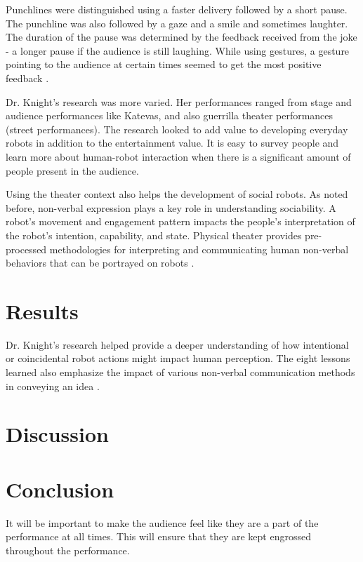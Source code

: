 \documentclass[onecolumn, draftclsnofoot,10pt, compsoc]{IEEEtran}
\begin{document}
Punchlines were distinguished using a faster delivery followed by a short pause. The punchline was also followed by a gaze and a smile and sometimes laughter. The duration of the pause was determined by the feedback received from the joke - a longer pause if the audience is still laughing. While using gestures, a gesture pointing to the audience at certain times seemed to get the most positive feedback \cite{RobotComedyLab:2015}.

Dr. Knight's research was more varied. Her performances ranged from stage and audience performances like Katevas, and also guerrilla theater performances (street performances). The research looked to add value to developing everyday robots in addition to the entertainment value. It is easy to survey people and learn more about human-robot interaction when there is a significant amount of people present in the audience. 

Using the theater context also helps the development of social robots. As noted before, non-verbal expression plays a key role in understanding sociability. A robot's movement and engagement pattern impacts the people's interpretation of the robot's intention, capability, and state. Physical theater provides pre-processed methodologies for interpreting and communicating human non-verbal behaviors that can be portrayed on robots \cite{KnightEightLessons:2011}.

\section{Results}

Dr. Knight's research helped provide a deeper understanding of how intentional or coincidental robot actions might impact human perception. The eight lessons learned also emphasize the impact of various non-verbal communication methods in conveying an idea \cite{KnightEightLessons:2011}.


\section{Discussion}


\section{Conclusion}

It will be important to make the audience feel like they are a part of the performance at all times. This will ensure that they are kept engrossed throughout the performance.  


\pagebreak




\end{document}
